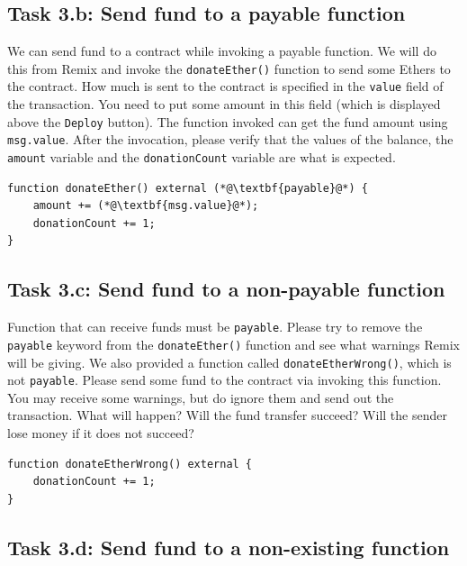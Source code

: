 \subsection{Task 3.b: Send fund to a payable function} 

We can send fund to a contract while invoking
a payable function. We will do this from Remix and
invoke the \texttt{donateEther()} function
to send some Ethers to the contract. How much is sent 
to the contract is specified in the \texttt{value}
field of the transaction. You need to put some amount 
in this field (which is displayed above the \texttt{Deploy}
button). The function invoked can get the fund amount
using \texttt{msg.value}. 
After the invocation, please verify that the values 
of the balance, the \texttt{amount} variable and 
the \texttt{donationCount} variable are what 
is expected. 

\begin{lstlisting}
function donateEther() external (*@\textbf{payable}@*) {
    amount += (*@\textbf{msg.value}@*);
    donationCount += 1;
}
\end{lstlisting}
 

\subsection{Task 3.c: Send fund to a non-payable function} 

Function that can receive funds must be \texttt{payable}.
Please try to remove the \texttt{payable} keyword 
from the \texttt{donateEther()} function and see what warnings Remix 
will be giving. We also provided a function called 
\texttt{donateEtherWrong()}, which is not \texttt{payable}.
Please send some fund to the contract via invoking 
this function. You may receive some warnings, but 
do ignore them and send out the transaction. What will 
happen? Will the fund transfer succeed? Will
the sender lose money if it does not succeed? 

\begin{lstlisting}
function donateEtherWrong() external {
    donationCount += 1;
}
\end{lstlisting}
 

\subsection{Task 3.d: Send fund to a non-existing function}

